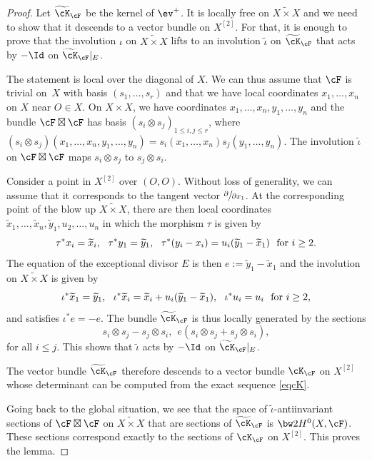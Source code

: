 \begin{proof}
Let $\widetilde\cK_\cF $ be the kernel of $\ev^+$. It is locally free on $\widetilde{X\times X}$ and we need to show that it descends to a vector bundle on $X^{[2]}$. For that, it is enough to prove that the involution $ {\iota}$ on $\widetilde{X\times X}$ lifts to an involution $\tilde{\iota}$ on $\widetilde\cK_\cF $ that acts by $-\Id$ on $\widetilde\cK_\cF\vert_E $.

The statement is local over the diagonal of $X$. We can thus assume that $\cF$ is trivial on~$X$ with basis $(s_1,\dots,s_r)$ and that we have local coordinates
$x_1,\dots,x_n$ on $X$ near $O\in X$. On $X\times X$, we have coordinates
$x_1,\dots,x_n,y_1,\dots,y_n$ and the bundle $\cF \boxtimes\cF$ has basis
$(s_i\otimes s_j)_{1\le i,j\le r}$, where $(s_i\otimes s_j)(x_1,\dots,x_n,y_1,\dots,y_n)=s_i(x_1,\dots,x_n)s_j( y_1,\dots,y_n)$.
The involution $\tilde{\iota}$ on $\cF \boxtimes\cF$ maps $s_i\otimes s_j$ to $s_j\otimes s_i$.

Consider a point in $ X^{[2]}$ over $(O,O)$. Without loss of generality, we can assume that it corresponds to the tangent vector $\sfrac{\partial}{\partial x_1}$.
At the corresponding point of the blow up $\widetilde{X\times X}$, there are then local coordinates
$\widetilde x_1,\dots,\widetilde x_n, \widetilde y_1,u_2,\dots,u_n$
in which the morphism $\tau$ is given by
\[
\tau^*x_i=\widetilde x_i,\ \ \tau^*y_1=\widetilde y_1,\ \ \tau^*(y_i-x_i)=u_i(\widetilde y_1-\widetilde x_1)\ \ \textnormal{for } i\ge 2.
\]
The equation of the exceptional divisor $E$ is then $e:=\widetilde y_1-\widetilde x_1$ and the involution
on
$\widetilde{X\times X}$ is given by
\[
\iota^*\widetilde x_1 =\widetilde y_1,\ \ \iota^*\widetilde x_i= \widetilde x_i+u_i(\widetilde y_1-\widetilde x_1),\ \ \iota^*u_i=u_i\ \ \textnormal{for } i\ge 2,
\]
and satisfies $\iota^*e=-e$.
The bundle $\widetilde\cK_\cF $ is thus locally generated by the sections
\[
s_i\otimes s_j-s_j\otimes s_i,\ \ e(s_i\otimes s_j+s_j\otimes s_i),
\]
for all $i\le j$. This shows that $\tilde{\iota}$ acts by $-\Id$ on $\widetilde\cK_\cF \vert_E$.

The vector bundle $\widetilde\cK_\cF $ therefore descends to a vector bundle $\cK_\cF $ on $X^{[2]}$ whose determinant can be computed from the exact sequence \eqref{eqcK}.

Going back to the global situation, we see that
the space of $\widetilde{\iota}$-antiinvariant sections of $\cF\boxtimes\cF$ on $\widetilde{X\times X}$ that
are sections of
$\widetilde\cK_\cF$ is $\bw2H^0(X,\cF)$. These sections correspond exactly to the sections of
$\cK_\cF$ on $X^{[2]}$. This proves the lemma.
\end{proof}

